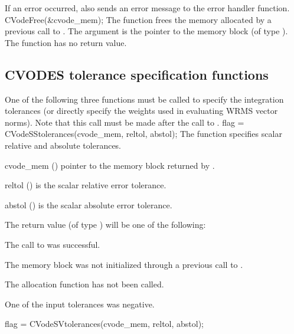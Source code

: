{
  If an error occurred,  also sends an error message to the
  error handler function.
}
{
  CVodeFree(\&cvode\_mem);
}
{
  The function  frees the memory allocated by
  a previous call to .
}
{
  The argument is the pointer to the {\cvodes} memory block (of type ).
}
{
  The function  has no return value.
}
{}


\subsection{CVODES tolerance specification functions}\label{sss:cvtolerances}
One of the following three functions must be called to specify the integration
tolerances (or directly specify the weights used in evaluating WRMS vector norms).
Note that this call must be made after the call to .
{
  flag = CVodeSStolerances(cvode\_mem, reltol, abstol);
}
{
  The function  specifies scalar relative and absolute
  tolerances.
}
{
  \begin{args}
  \item[cvode\_mem] ()
    pointer to the {\cvodes} memory block returned by .
  \item[reltol] ()
    is the scalar relative error tolerance.
  \item[abstol] ()
    is the scalar absolute error tolerance.
  \end{args}
}
{
  The return value  (of type ) will be one of the following:
  \begin{args}
  \item[\Id{CV\_SUCCESS}]
    The call to  was successful.
  \item[\Id{CV\_MEM\_NULL}]
    The {\cvodes} memory block was not initialized through a previous call to
    .
  \item[\Id{CV\_NO\_MALLOC}]
    The allocation function  has not been called.
  \item[\Id{CV\_ILL\_INPUT}]
    One of the input tolerances was negative.
  \end{args}
}
{}
{
  flag = CVodeSVtolerances(cvode\_mem, reltol, abstol);
}
